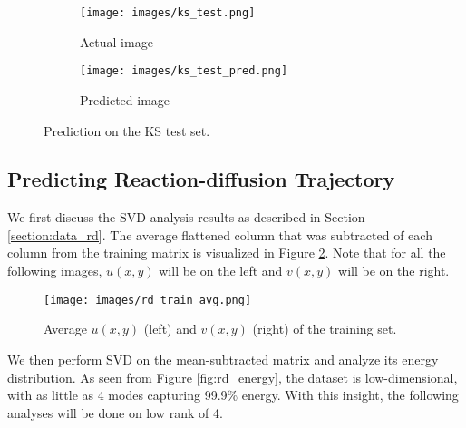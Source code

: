 \documentclass[letterpaper, 10 pt, conference]{ieeeconf}  %
\begin{document}
\begin{figure}[htb]
\centering
\begin{subfigure}{.5\columnwidth}
  \centering
  \texttt{[image: images/ks\_test.png]}
  \caption{Actual image}
\end{subfigure}%
\begin{subfigure}{.5\columnwidth}
  \centering
  \texttt{[image: images/ks\_test\_pred.png]}
  \caption{Predicted image}
\end{subfigure}
\caption{Prediction on the KS test set.}
\label{fig:ks_test_pred}
\end{figure}

\subsection{Predicting Reaction-diffusion Trajectory}
We first discuss the SVD analysis results as described in Section \ref{section:data_rd}. The average flattened column that was subtracted of each column from the training matrix is visualized in Figure \ref{fig:rd_train_avg}. Note that for all the following images, $u(x,y)$ will be on the left and $v(x,y)$ will be on the right.

\begin{figure}[htb]
\centering
\texttt{[image: images/rd\_train\_avg.png]}
\caption{Average $u(x,y)$ (left) and $v(x,y)$ (right) of the training set.}
\label{fig:rd_train_avg}
\end{figure}

We then perform SVD on the mean-subtracted matrix and analyze its energy distribution. As seen from Figure \ref{fig:rd_energy}, the dataset is low-dimensional, with as little as 4 modes capturing 99.9\% energy. With this insight, the following analyses will be done on low rank of 4.
\end{document}
